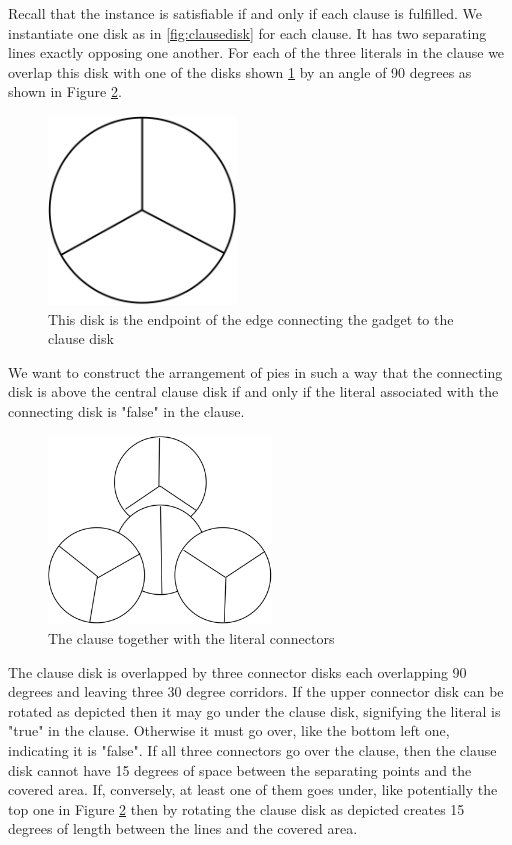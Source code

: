 \documentclass[a4paper,11pt]{article}
\begin{document}
Recall that the instance is satisfiable if and only if each clause is fulfilled. We instantiate one disk as in \ref{fig:clausedisk} for each clause. It has two separating lines exactly opposing one another. For each of the three literals in the clause we overlap this disk with one of the disks shown \ref{fig:clauseconnector} by an angle of 90 degrees as shown in Figure \ref{fig:clauseconnection}.

\begin{figure}[h]
  \centering
  \includegraphics[height=5cm]{assets/np-hardness/clause_connector.png}
  \caption{This disk is the endpoint of the edge connecting the gadget to the clause disk}
  \label{fig:clauseconnector}
\end{figure}

We want to construct the arrangement of pies in such a way that the connecting disk is above the central clause disk if and only if the literal associated with the connecting disk is "false" in the clause.

\begin{figure}[h]
  \centering
  \includegraphics[height=5cm]{assets/np-hardness/literal_clause.png}
  \caption{The clause together with the literal connectors}
  \label{fig:clauseconnection}
\end{figure}

The clause disk is overlapped by three connector disks each overlapping 90 degrees and leaving three 30 degree corridors. If the upper connector disk can be rotated as depicted then it may go under the clause disk, signifying the literal is "true" in the clause. Otherwise it must go over, like the bottom left one, indicating it is "false".
If all three connectors go over the clause, then the clause disk cannot have 15 degrees of space between the separating points and the covered area. If, conversely, at least one of them goes under, like potentially the top one in Figure \ref{fig:clauseconnection} then by rotating the clause disk as depicted creates 15 degrees of length between the lines and the covered area.
\end{document}
